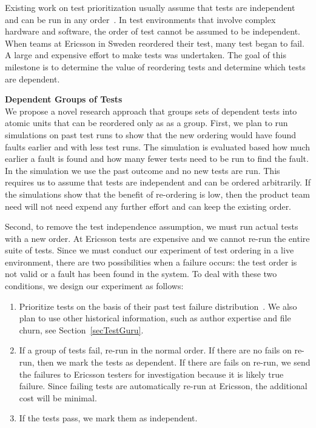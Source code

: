 Existing work on test prioritization usually assume that tests are independent and can be run in any order~\cite{Marijan2013ICSM,Elbaum2014FSE,Hemmati2015ICVV}. In test environments that involve complex hardware and software, the order of test cannot be assumed to be independent. When teams at Ericsson in Sweden reordered their test, many test began to fail. A large and expensive effort to make tests was undertaken. The goal of this milestone is to determine the value of reordering tests and determine which tests are dependent.

\textbf{Dependent Groups of Tests}\\
We propose a novel research approach that groups sets of dependent tests into atomic units that can be reordered only as as a group. 
%
First, we plan to run simulations on past test runs to show that the new ordering would have found faults earlier and with less test runs. The simulation is evaluated based how much earlier a fault is found and how many fewer tests need to be run to find the fault. 
%
In the simulation we use the past outcome and no new tests are run. This requires us to assume that tests are independent and can be ordered arbitrarily. If the simulations show that the benefit of re-ordering is low, then the product team need will not need expend any further effort and can keep the existing order.

Second, to remove the test independence assumption, we must run actual tests with a new order. At Ericsson tests are expensive and we cannot re-run the entire suite of tests. 
%
Since we must conduct our experiment of test ordering in a live environment, there are two possibilities when a failure occurs: the test order is not valid or a fault has been found in the system. To deal with these two conditions, we design our experiment as follows:

\begin{enumerate}

\item Prioritize tests on the basis of their past test failure distribution~\cite{Kim2002ICSE,Hemmati}. We also plan to use other historical information, such as author expertise and file churn, see Section~\ref{secTestGuru}.

\item If a group of tests fail, re-run in the normal order. If there are no fails on re-run, then we mark the tests as dependent. If there are fails on re-run, we send the failures to Ericsson testers for investigation because it is likely true failure. Since failing tests are automatically re-run at Ericsson, the additional cost will be minimal.
 
\item If the tests pass, we mark them as independent.

\end{enumerate}

